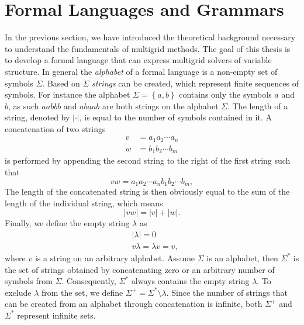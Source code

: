 \section{Formal Languages and Grammars}
\label{sec:formal-languages}
In the previous section, we have introduced the theoretical background necessary to understand the fundamentals of multigrid methods.
The goal of this thesis is to develop a formal language that can express multigrid solvers of variable structure.
In general the \emph{alphabet} of a formal language is a non-empty set of symbols $\Sigma$.
Based on $\Sigma$ \emph{strings} can be created, which represent finite sequences of symbols.
For instance the alphabet $\Sigma = \left\{a, b\right\}$ contains only the symbols $a$ and $b$, as such $aabbb$ and $abaab$ are both strings on the alphabet $\Sigma$.
The length of a string, denoted by $|\cdot|$, is equal to the number of symbols contained in it. 
A concatenation of two strings 
\begin{equation}
	\begin{split}
		v & = a_1 a_2 \cdots a_n \\
		w & = b_1 b_2 \cdots b_m
	\end{split}
\end{equation}
is performed by appending the second string to the right of the first string such that
\begin{equation}
	vw = a_1 a_2 \cdots a_n b_1 b_2 \cdots b_m,
\end{equation}
The length of the concatenated string is then obviously equal to the sum of the length of the individual string, which means
\begin{equation}
|vw| = |v| + |w|.
\end{equation}
Finally, we define the empty string $\lambda$ as
\begin{equation}
	\begin{split}
		& |\lambda| = 0 \\
		& v \lambda = \lambda v = v,
	\end{split}
\end{equation}
where $v$ is a string on an arbitrary alphabet.
Assume $\Sigma$ is an alphabet, then $\Sigma^*$ is the set of strings obtained by concatenating zero or an arbitrary number of symbols from $\Sigma$.
Consequently, $\Sigma^*$ always contains the empty string $\lambda$.
To exclude $\lambda$ from the set, we define $\Sigma^+ = \Sigma^* \setminus \lambda$.
Since the number of strings that can be created from an alphabet through concatenation is infinite, both $\Sigma^+$ and $\Sigma^*$ represent infinite sets.

